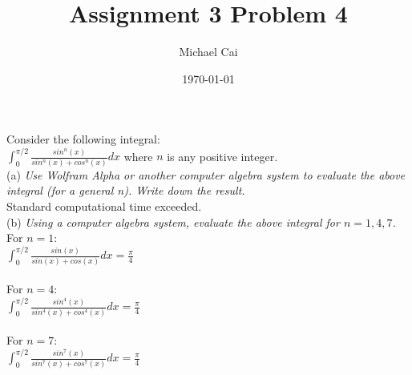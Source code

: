 \documentclass[11pt, oneside]{article}   	%
\title{Assignment 3 Problem 4}
\author{Michael Cai}
\date{\today}							%
\begin{document}
\maketitle

\noindent Consider the following integral:\\
$\int_0^{\pi/2} \frac{sin^n(x)}{sin^n(x) + cos^n(x)} dx$ where $n$ is any positive integer.\\

\noindent (a) \textit{Use Wolfram Alpha or another computer algebra system to evaluate the above integral (for a general n). Write down the result.}\\
Standard computational time exceeded.\\

\noindent (b) \textit{Using a computer algebra system, evaluate the above integral for $n = 1,4,7$.}\\
For $n = 1$:\\
$\int_0^{\pi/2} \frac{sin(x)}{sin(x) + cos(x)} dx = \frac{\pi}{4}$\\~\\
For $n = 4$:\\
$\int_0^{\pi/2} \frac{sin^4(x)}{sin^4(x) + cos^4(x)} dx = \frac{\pi}{4}$\\~\\
For $n = 7$:\\
$\int_0^{\pi/2} \frac{sin^7(x)}{sin^7(x) + cos^7(x)} dx = \frac{\pi}{4}$\\~\\
\end{document}
